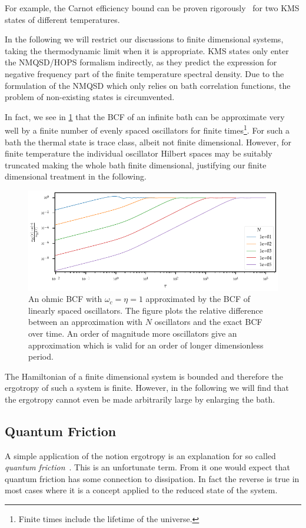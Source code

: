 For example, the Carnot efficiency bound can be proven
rigorously~\cite{Pusz1978Oct} for two KMS states of different
temperatures.

In the following we will restrict our discussions to finite
dimensional systems, taking the thermodynamic limit when it is
appropriate. KMS states only enter the NMQSD/HOPS formalism
indirectly, as they predict the expression for negative frequency part
of the finite temperature spectral density. Due to the formulation of
the NMQSD which only relies on bath correlation functions, the problem
of non-existing states is circumvented.

In fact, we see in \cref{fig:bcf_approx} that the BCF of an infinite
bath can be approximate very well by a finite number of evenly spaced
oscillators for finite times\footnote{Finite times include the
  lifetime of the universe.}. For such a bath the thermal state is
trace class, albeit not finite dimensional. However, for finite
temperature the individual oscillator Hilbert spaces may be suitably
truncated making the whole bath finite dimensional, justifying our
finite dimensional treatment in the following.
\begin{figure}[h]
  \centering
  \includegraphics{figs/misc/bcf_approx}
  \caption{\label{fig:bcf_approx} An ohmic BCF with \(ω_{c}=η=1\)
    approximated by the BCF of linearly spaced oscillators. The figure
    plots the relative difference between an approximation with \(N\)
    oscillators and the exact BCF over time. An order of magnitude
    more oscillators give an approximation which is valid for an order
    of longer dimensionless period.}
\end{figure}

The Hamiltonian of a finite dimensional system is bounded and
therefore the ergotropy of such a system is finite. However, in the
following we will find that the ergotropy cannot even be made
arbitrarily large by enlarging the bath.


\subsection{Quantum Friction}
\label{sec:quantum_friction_theory}
A simple application of the notion ergotropy is an explanation for so
called \emph{quantum
  friction}~\cite{Binder2018,Mukherjee2020Jan}. This is an
unfortunate term. From it one would expect that quantum friction has
some connection to dissipation. In fact the reverse is true in most
cases where it is a concept applied to the reduced state of the
system.

